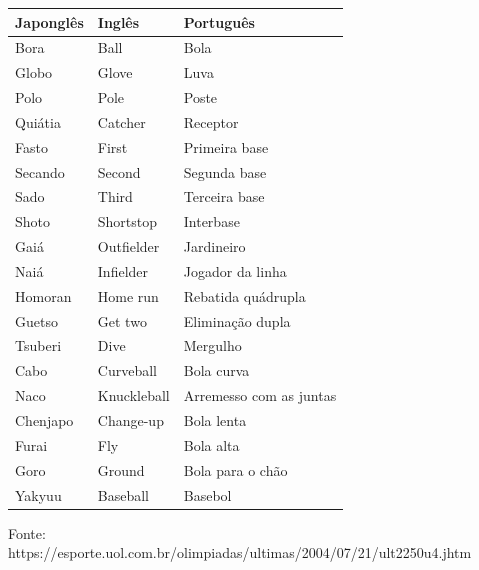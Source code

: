 \begin{table}[!ht]
	\begin{center}
		\begin{tabular}{lll}
			Japonglês & Inglês      & Português               \\\hline\hline
			Bora      & Ball        & Bola                    \\\hline
			Globo     & Glove       & Luva                    \\\hline
			Polo      & Pole        & Poste                   \\\hline
			Quiátia   & Catcher     & Receptor                \\\hline
			Fasto     & First       & Primeira base           \\\hline
			Secando   & Second      & Segunda base            \\\hline
			Sado      & Third       & Terceira base           \\\hline
			Shoto     & Shortstop   & Interbase               \\\hline
			Gaiá      & Outfielder  & Jardineiro              \\\hline
			Naiá      & Infielder   & Jogador da linha        \\\hline
			Homoran   & Home run    & Rebatida quádrupla      \\\hline
			Guetso    & Get two     & Eliminação dupla        \\\hline
			Tsuberi   & Dive        & Mergulho                \\\hline
			Cabo      & Curveball   & Bola curva              \\\hline
			Naco      & Knuckleball & Arremesso com as juntas \\\hline
			Chenjapo  & Change-up   & Bola lenta              \\\hline
			Furai     & Fly         & Bola alta               \\\hline
			Goro      & Ground      & Bola para o chão       \\\hline
			Yakyuu    & Baseball	& Basebol
		\end{tabular}
		
		\vspace{5mm}
		\footnotesize{Fonte: https://esporte.uol.com.br/olimpiadas/ultimas/2004/07/21/ult2250u4.jhtm}
	\end{center}
\end{table}

\newpage

